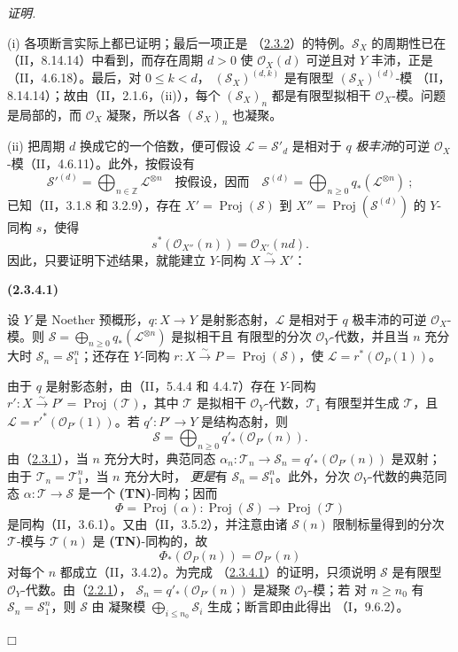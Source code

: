 \documentclass[UTF8,fontset=none,11pt,oneside,openany]{ctexbook}
\providecommand{\square}{\mdlgwhtsquare}
\newenvironment{env}[1][]{%
  \par\medskip\noindent\textbf{(#1)}\ %
}{\par}
\newenvironment{proof}{%
  \par\smallskip\noindent\textit{证明.}\ %
}{\hfill$\square$\par}
\newcommand{\oldpage}[2][]{%
  \hypertarget{ega-source-page-#1-#2}{}%
  \marginnote{\scriptsize\textbf{#1}~|~#2}\ignorespaces}
\let\EGAOriginalLabel\label
\renewcommand{\label}[1]{\phantomsection\EGAOriginalLabel{#1}}
\begin{document}
\begin{proof}
(i) 各项断言实际上都已证明；最后一项正是
（\hyperref[III.2.3.2-fr]{2.3.2}）的特例。$\mathcal S_X$ 的周期性已在
（II，8.14.14）中看到，而存在周期 $d>0$ 使 $\mathcal O_X(d)$ 可逆且对
$Y$ 丰沛，正是（II，4.6.18）。最后，对 $0\leq k<d$，
$(\mathcal S_X)^{(d,k)}$ 是有限型 $(\mathcal S_X)^{(d)}$-模
（II，8.14.14）；故由（II，2.1.6，(ii)），每个 $(\mathcal S_X)_n$
都是有限型拟相干 $\mathcal O_X$-模。问题是局部的，而 $\mathcal O_X$
凝聚，所以各 $(\mathcal S_X)_n$ 也凝聚。

(ii) 把周期 $d$ 换成它的一个倍数，便可假设
$\mathcal L=\mathcal S'_d$ 是相对于 $q$ \emph{极丰沛}的可逆
$\mathcal O_X$-模（II，4.6.11）。此外，按假设有
\[
\mathcal S'^{(d)}=\bigoplus_{n\in\mathbb Z}\mathcal L^{\otimes n}
\quad\text{按假设，因而}\quad
\mathcal S^{(d)}=\bigoplus_{n\geq0}q_*(\mathcal L^{\otimes n})~;
\]
已知（II，3.1.8 和 3.2.9），存在 $X'=\operatorname{Proj}(\mathcal S)$
到 $X''=\operatorname{Proj}(\mathcal S^{(d)})$ 的 $Y$-同构 $s$，使得
\oldpage[III]{105}
\[
s^*(\mathcal O_{X''}(n))=\mathcal O_{X'}(nd).
\]
因此，只要证明下述结果，就能建立 $Y$-同构 $X\xrightarrow{\sim}X'$：

\begin{env}[2.3.4.1]
\label{III.2.3.4.1-fr}
设 $Y$ 是 Noether 预概形，$q:X\to Y$ 是射影态射，$\mathcal L$ 是相对于
$q$ 极丰沛的可逆 $\mathcal O_X$-模。则
$\mathcal S=\bigoplus_{n\geq0}q_*(\mathcal L^{\otimes n})$ 是拟相干且
有限型的分次 $\mathcal O_Y$-代数，并且当 $n$ 充分大时
$\mathcal S_n=\mathcal S_1^n$；还存在 $Y$-同构
$r:X\xrightarrow{\sim}P=\operatorname{Proj}(\mathcal S)$，使
$\mathcal L=r^*(\mathcal O_P(1))$。
\end{env}

由于 $q$ 是射影态射，由（II，5.4.4 和 4.4.7）存在 $Y$-同构
$r':X\xrightarrow{\sim}P'=\operatorname{Proj}(\mathcal T)$，其中
$\mathcal T$ 是拟相干 $\mathcal O_Y$-代数，$\mathcal T_1$ 有限型并生成
$\mathcal T$，且 $\mathcal L=r'^*(\mathcal O_{P'}(1))$。若
$q':P'\to Y$ 是结构态射，则
\[
\mathcal S=\bigoplus_{n\geq0}q'_*(\mathcal O_{P'}(n)).
\]
由（\hyperref[III.2.3.1-fr]{2.3.1}），当 $n$ 充分大时，典范同态
$\alpha_n:\mathcal T_n\to\mathcal S_n=q'_*(\mathcal O_{P'}(n))$ 是双射；
由于 $\mathcal T_n=\mathcal T_1^n$，当 $n$ 充分大时，
\emph{更是}有 $\mathcal S_n=\mathcal S_1^n$。此外，分次
$\mathcal O_Y$-代数的典范同态 $\alpha:\mathcal T\to\mathcal S$ 是一个
\textbf{(TN)}-同构；因而
\label{III.2.3.5.1-fr}
\[
\Phi=\operatorname{Proj}(\alpha):
\operatorname{Proj}(\mathcal S)\longrightarrow
\operatorname{Proj}(\mathcal T)
\]
是同构（II，3.6.1）。又由（II，3.5.2），并注意由诸
$\mathcal S(n)$ 限制标量得到的分次 $\mathcal T$-模与 $\mathcal T(n)$
是 \textbf{(TN)}-同构的，故
\[
\Phi_*(\mathcal O_P(n))=\mathcal O_{P'}(n)
\]
对每个 $n$ 都成立（II，3.4.2）。为完成
（\hyperref[III.2.3.4.1-fr]{2.3.4.1}）的证明，只须说明 $\mathcal S$
是有限型 $\mathcal O_Y$-代数。由（\hyperref[III.2.2.1-fr]{2.2.1}），
$\mathcal S_n=q'_*(\mathcal O_{P'}(n))$ 是凝聚 $\mathcal O_Y$-模；若
对 $n\geq n_0$ 有 $\mathcal S_n=\mathcal S_1^n$，则 $\mathcal S$ 由
凝聚模 $\bigoplus_{i\leq n_0}\mathcal S_i$ 生成；断言即由此得出
（I，9.6.2）。


\end{proof}
\end{document}
